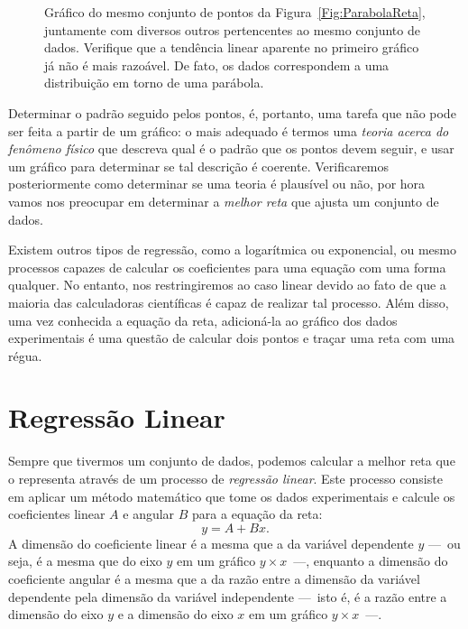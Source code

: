 \begin{figure}
\centering
\forceversofloat
\caption{Gráfico do mesmo conjunto de pontos da Figura~\ref{Fig:ParabolaReta}, juntamente com diversos outros pertencentes ao mesmo conjunto de dados. Verifique que a tendência linear aparente no primeiro gráfico já não é mais razoável. De fato, os dados correspondem a uma distribuição em torno de uma parábola.}
\label{Fig:ParabolaReta2}

\end{figure}

Determinar o padrão seguido pelos pontos, é, portanto, uma tarefa que não pode ser feita a partir de um gráfico: o mais adequado é termos uma \emph{teoria acerca do fenômeno físico} que descreva qual é o padrão que os pontos devem seguir, e usar um gráfico para determinar se tal descrição é coerente. Verificaremos posteriormente como determinar se uma teoria é plausível ou não, por hora vamos nos preocupar em determinar a \emph{melhor reta} que ajusta um conjunto de dados.

Existem outros tipos de regressão, como a logarítmica ou exponencial, ou mesmo processos capazes de calcular os coeficientes para uma equação com uma forma qualquer. No entanto, nos restringiremos ao caso linear devido ao fato de que a maioria das calculadoras científicas é capaz de realizar tal processo. Além disso, uma vez conhecida a equação da reta, adicioná-la ao gráfico dos dados experimentais é uma questão de calcular dois pontos e traçar uma reta com uma régua.%

\section{Regressão Linear}
\label{Sec:RegressaoLinear}

Sempre que tivermos um conjunto de dados, podemos calcular a melhor reta que o representa através de um processo de \emph{regressão linear}. Este processo consiste em aplicar um método matemático que tome os dados experimentais e calcule os coeficientes linear $A$ e angular $B$ para a equação da reta:
\begin{equation}
	y = A + Bx.
\end{equation}
%
A dimensão do coeficiente linear é a mesma que a da variável dependente $y$ ---~ou seja, é a mesma que do eixo $y$ em um gráfico $y \times x$~---, enquanto a dimensão do coeficiente angular é a mesma que a da razão entre a dimensão da variável dependente pela dimensão da variável independente ---~isto é, é a razão entre a dimensão do eixo $y$ e a dimensão do eixo $x$ em um gráfico $y \times x$~---. 

